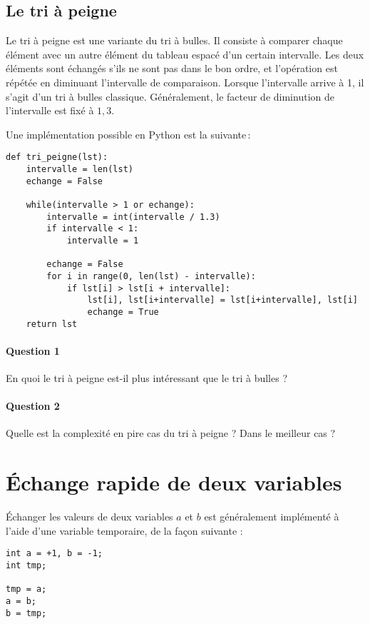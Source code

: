 \documentclass{article}%
\begin{document}
\subsection{Le tri à peigne}

Le tri à peigne est une variante du tri à bulles. Il consiste à comparer chaque élément avec un autre élément du tableau espacé d'un certain intervalle. Les deux éléments sont échangés s'ils ne sont pas dans le bon ordre, et l'opération est répétée en diminuant l'intervalle de comparaison. Lorsque l'intervalle arrive à 1, il s'agit d'un tri à bulles classique. Généralement, le facteur de diminution de l'intervalle est fixé à $1,3$.

Une implémentation possible en Python est la suivante\,:
\begin{verbatim}
def tri_peigne(lst):
    intervalle = len(lst)
    echange = False
    
    while(intervalle > 1 or echange):
        intervalle = int(intervalle / 1.3)
        if intervalle < 1:
            intervalle = 1
    
        echange = False
        for i in range(0, len(lst) - intervalle):
            if lst[i] > lst[i + intervalle]:
                lst[i], lst[i+intervalle] = lst[i+intervalle], lst[i]
                echange = True
    return lst
\end{verbatim}

\paragraph{Question 1} En quoi le tri à peigne est-il plus intéressant que le tri à bulles ?

\paragraph{Question 2} Quelle est la complexité en pire cas du tri à peigne ? Dans le meilleur cas ?

\section{Échange rapide de deux variables}

Échanger les valeurs de deux variables $a$ et $b$ est généralement implémenté à l'aide d'une variable temporaire, de la façon suivante :

\begin{verbatim}
int a = +1, b = -1;
int tmp;

tmp = a;
a = b;
b = tmp;
\end{verbatim}
\end{document}

